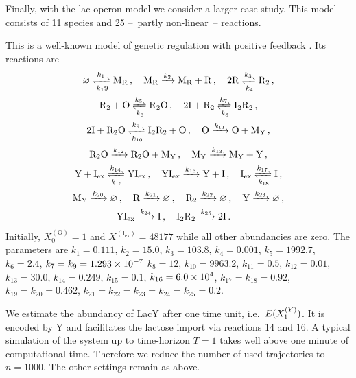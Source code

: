Finally, with the lac operon model we consider a larger case study. This model consists of \num{11} species and \num{25} --~partly non-linear~-- reactions.
\begin{model}\label{model:lac}This is a well-known model of genetic regulation with positive feedback \parencite{stamatakis2009comparison}. Its reactions are
 \begin{gather*}
 \varnothing \xrightleftharpoons[k_19]{k_1} \mathrm{M_R}\,, \quad
 \mathrm{M_R} \xrightarrow{k_2} \mathrm{M_R + R}\,,\quad
 2 \mathrm{R} \xrightleftharpoons[k_4]{k_3} \mathrm{R_2}\,,\\
 \mathrm{R_2 + O} \xrightleftharpoons[k_6]{k_5}\mathrm{ R_2O}\,,\quad
 \mathrm{2 I + R_2} \xrightleftharpoons[k_8]{k_7} \mathrm{I_2R_2}\,,\\
\mathrm{2I +R_2O} \xrightleftharpoons[k_{10}]{k_9} \mathrm{I_2R_2 + O}\,,\quad
\mathrm{O}\xrightarrow{k_{11}} \mathrm{O + M_Y}\,,\\
\mathrm{R_2O}\xrightarrow{k_{12}}\mathrm{R_2O+M_Y}\,,\quad
\mathrm{M_Y} \xrightarrow{k_{13}}\mathrm{M_Y + Y}\,,\\
\mathrm{Y + I_{{ex}}}\xrightleftharpoons[k_{15}]{k_{14}}\mathrm{YI_{{ex}}}\,,\quad
\mathrm{YI_{{ex}}}\xrightarrow{k_{16}}\mathrm{Y+I}\,,\quad
\mathrm{I_{{ex}}}\xrightleftharpoons[k_{18}]{k_{17}}\mathrm{I}\,,\\
\mathrm{M_Y}\xrightarrow{k_{20}}\varnothing\,,\quad
\mathrm{R}\xrightarrow{k_{21}}\varnothing\,,\quad
\mathrm{R_2}\xrightarrow{k_{22}}\varnothing\,,\quad
\mathrm{Y}\xrightarrow{k_{23}}\varnothing\,,\\
\mathrm{YI_{ex}}\xrightarrow{k_{24}}\mathrm{I}\,,\quad
\mathrm{I_2R_2}\xrightarrow{k_{25}}\mathrm{2I}\,.\quad
\end{gather*}
Initially, $X^{(\mathrm{O})}_0=1$ and $X^{(\mathrm{I_{{ex}}})}=\num{48177}$ while all other abundancies are zero.
The parameters are $
  k_1  = 0.111$,
 $ k_2  = 15.0$,
  $k_3  = 103.8$,
  $k_4  = \num{0.001}$,
  $k_5  = 1992.7$,
  $k_6  = 2.4$,
  $k_7 =k_9  = \num{1.293d-7}$
  $k_8  = 12$,
  $k_{10} = 9963.2$,
  $k_{11} = 0.5$,
  $k_{12} = 0.01$,
  $k_{13} = 30.0$,
  $k_{14} = 0.249$,
  $k_{15} = 0.1$,
  $k_{16} = \num{6.0d4}$,
  $k_{17} =k_{18} = 0.92$,
  $k_{19} = k_{20} = 0.462$,
  $k_{21}=k_{22}= k_{23} = k_{24} = k_{25} = 0.2$.
\end{model}
We estimate the abundancy of LacY after one time unit, i.e.\ ${E}(X^{(Y)}_1)$.
It is encoded by Y and facilitates
the lactose import via reactions \num{14} and \num{16}.
A typical simulation of the system up to time-horizon $T=1$ takes well above one minute of computational time.
Therefore we reduce the number of used trajectories to $n=1000$.
The other settings remain as above.

